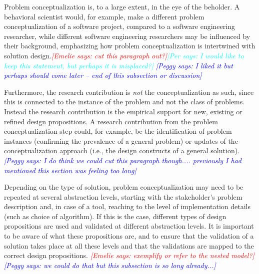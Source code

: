\documentclass[graybox]{svmult}
\newcommand{\emelie}[1]{\textcolor{red}{{\it [Emelie says: #1]}}}
\newcommand{\peggy}[1]{\textcolor{blue}{{\it [Peggy says: #1]}}}
\newcommand{\per}[1]{\textcolor{cyan}{{\it [Per says: #1]}}}
\newcommand{\emelie}[1]{}
\newcommand{\peggy}[1]{}
\newcommand{\per}[1]{}
\begin{document}
Problem conceptualization is, to a large extent, in the eye of the beholder. A behavioral scientist would, for example, make a different problem conceptualization of a software project, compared to a software engineering researcher, while different software engineering researchers may be influenced by their background, emphasizing how problem conceptualization is intertwined with solution design.\emelie{cut this paragraph out?}\per{I would like to keep this statement, but perhaps it is misplaced?}
\peggy{I liked it but perhaps should come later -- end of this subsection or discussion}


Furthermore, the research contribution is \emph{not} the conceptualization as such, since this is connected to the instance of the problem and not the class of problems. Instead the research contribution is the empirical support for new, existing or refined design propositions. A research contribution from the problem conceptualization step could, for example, be the identification of problem instances (confirming the prevalence of a general problem) or updates of the conceptualization approach (i.e., the design constructs of a general solution).
\peggy{I do think we could cut this paragraph though.... previously I had mentioned this section was feeling too long}


Depending on the type of solution, problem conceptualization may need to be repeated at several abstraction levels, starting with the stakeholder's problem description and, in case of a tool, reaching to the level of implementation details (such as choice of algorithm). If this is the case, different types of design propositions are used and validated at different abstraction levels. It is important to be aware of what these propositions are, and to ensure that the validation of a solution takes place at all these levels and that the validations are mapped to the correct design propositions. \emelie{exemplify or refer to the nested model?}  \peggy{we could do that but this subsection is so long already...}
\end{document}
